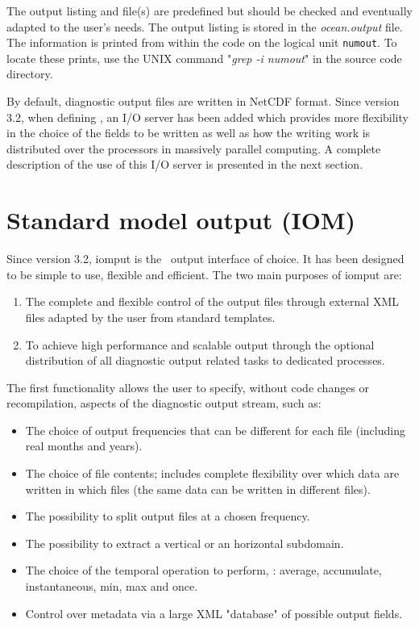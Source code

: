 \documentclass[../main/NEMO_manual]{subfiles}
\begin{document}
The output listing and file(s) are predefined but should be checked and eventually adapted to the user's needs.
The output listing is stored in the \textit{ocean.output} file.
The information is printed from within the code on the logical unit \texttt{numout}.
To locate these prints, use the UNIX command "\textit{grep -i numout}" in the source code directory.

By default, diagnostic output files are written in NetCDF format.
Since version 3.2, when defining , an I/O server has been added which
provides more flexibility in the choice of the fields to be written as well as how
the writing work is distributed over the processors in massively parallel computing.
A complete description of the use of this I/O server is presented in the next section.


\section{Standard model output (IOM)}
\label{sec:DIA_iom}

Since version 3.2, iomput is the \NEMO\ output interface of choice.
It has been designed to be simple to use, flexible and efficient.
The two main purposes of iomput are:

\begin{enumerate}
\item The complete and flexible control of the output files through external XML files adapted by
  the user from standard templates.
\item To achieve high performance and scalable output through the optional distribution of
  all diagnostic output related tasks to dedicated processes.
\end{enumerate}

The first functionality allows the user to specify, without code changes or recompilation,
aspects of the diagnostic output stream, such as:

\begin{itemize}
\item The choice of output frequencies that can be different for each file (including real months and years).
\item The choice of file contents; includes complete flexibility over which data are written in which files
  (the same data can be written in different files).
\item The possibility to split output files at a chosen frequency.
\item The possibility to extract a vertical or an horizontal subdomain.
\item The choice of the temporal operation to perform, \eg: average, accumulate, instantaneous, min, max and once.
\item Control over metadata via a large XML "database" of possible output fields.
\end{itemize}
\end{document}
